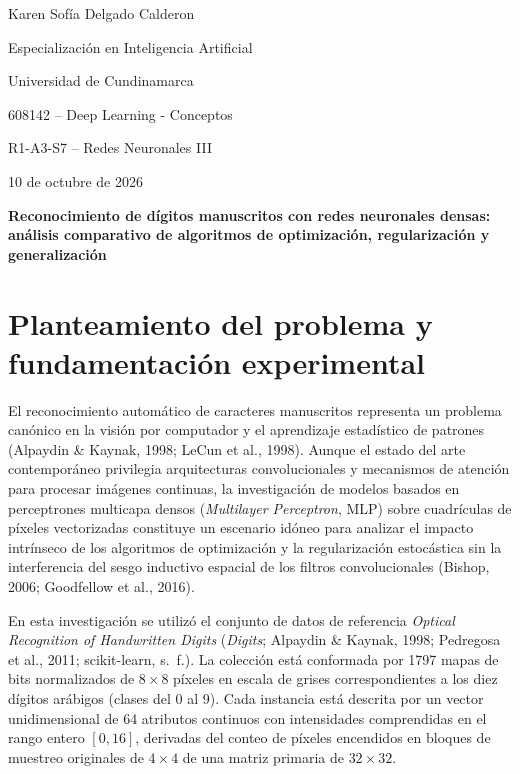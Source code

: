 \documentclass[12pt,letterpaper]{article}
\begin{document}
\raggedright
\begin{titlepage}\thispagestyle{fancy}\begin{center}
\vspace*{1in}{\bfseries Reconocimiento de dígitos manuscritos con redes neuronales densas: análisis comparativo de algoritmos de optimización, regularización y generalización\par}\vspace{1\baselineskip}
Karen Sofía Delgado Calderon\par
Especialización en Inteligencia Artificial\par Universidad de Cundinamarca\par
608142 -- Deep Learning - Conceptos\par R1-A3-S7 -- Redes Neuronales III\par 10 de octubre de 2026\par
\end{center}\vfill\end{titlepage}\setcounter{page}{2}
\begin{center}\textbf{Reconocimiento de dígitos manuscritos con redes neuronales densas: análisis comparativo de algoritmos de optimización, regularización y generalización}\end{center}

\section{Planteamiento del problema y fundamentación experimental}
El reconocimiento automático de caracteres manuscritos representa un problema canónico en la visión por computador y el aprendizaje estadístico de patrones (Alpaydin \& Kaynak, 1998; LeCun et al., 1998). Aunque el estado del arte contemporáneo privilegia arquitecturas convolucionales y mecanismos de atención para procesar imágenes continuas, la investigación de modelos basados en perceptrones multicapa densos (\textit{Multilayer Perceptron}, MLP) sobre cuadrículas de píxeles vectorizadas constituye un escenario idóneo para analizar el impacto intrínseco de los algoritmos de optimización y la regularización estocástica sin la interferencia del sesgo inductivo espacial de los filtros convolucionales (Bishop, 2006; Goodfellow et al., 2016).

En esta investigación se utilizó el conjunto de datos de referencia \textit{Optical Recognition of Handwritten Digits} (\textit{Digits}; Alpaydin \& Kaynak, 1998; Pedregosa et al., 2011; scikit-learn, s.~f.). La colección está conformada por 1797 mapas de bits normalizados de $8 \times 8$ píxeles en escala de grises correspondientes a los diez dígitos arábigos (clases del 0 al 9). Cada instancia está descrita por un vector unidimensional de 64 atributos continuos con intensidades comprendidas en el rango entero $[0, 16]$, derivadas del conteo de píxeles encendidos en bloques de muestreo originales de $4 \times 4$ de una matriz primaria de $32 \times 32$.
\end{document}
